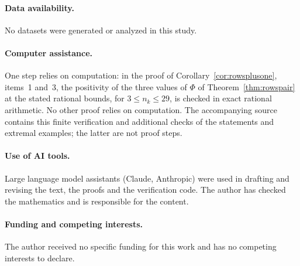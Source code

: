 \documentclass[11pt]{article}
\begin{document}
\paragraph{Data availability.}
No datasets were generated or analyzed in this study.

\paragraph{Computer assistance.}
One step relies on computation: in the proof of
Corollary~\ref{cor:rowsplusone}, items~1 and~3, the positivity of the three
values of $\Phi$ of Theorem~\ref{thm:rowspair} at the stated rational
bounds, for $3\le n_k\le29$, is checked in exact rational arithmetic.  No
other proof relies on computation.  The accompanying source contains this
finite verification and additional checks of the statements and extremal
examples; the latter are not proof steps.

\paragraph{Use of AI tools.}
Large language model assistants (Claude, Anthropic) were used in drafting and
revising the text, the proofs and the verification code.  The author has checked the mathematics and is responsible for
the content.

\paragraph{Funding and competing interests.}
The author received no specific funding for this work and has no competing
interests to declare.
\end{document}
